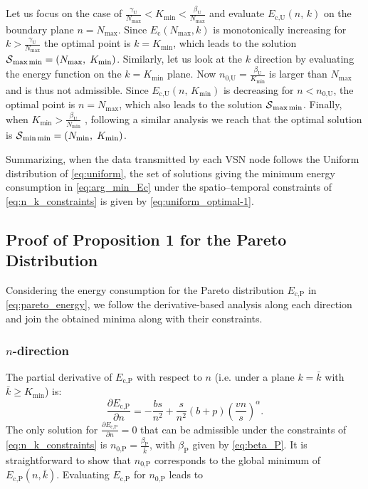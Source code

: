 \documentclass[twocolumn,english]{IEEEtran}
\theoremstyle{plain}
\theoremstyle{definition}
\begin{document}
Let us focus on the case of $\frac{\gamma_{\textrm{U}}}{N_{\text{max}}}<K_{\text{min}}<\frac{\beta_{\text{U}}}{N_{\max}}$
and evaluate $E_{\text{c,U}}(n,\, k)$ on the boundary plane $n=N_{\text{max}}$.
Since $E_{\text{c}}(N_{\text{max}},k)$ is monotonically increasing
for $k>\frac{\gamma_{\textrm{U}}}{N_{\text{max}}}$ the optimal point
is $k=K_{\text{min}}$, which leads to the solution $\text{\ensuremath{\mathcal{S}}}_{\max\min}=\left(N_{\text{max}},\; K_{\text{min}}\right)$.
Similarly, let us look at the $k$ direction by evaluating the energy
function on the $k=K_{\text{min}}$ plane. Now $n_{\text{0,U}}=\frac{\beta_{\text{U}}}{K_{\text{min}}}$
is larger than $N_{\text{max}}$ and is thus not admissible. Since
$E_{\text{c,U}}(n,\, K_{\text{min}})$ is decreasing for $n<n_{\text{0,U}}$,
the optimal point is $n=N_{\text{max}}$, which also leads to the
solution $\text{\ensuremath{\mathcal{S}}}_{\max\min}$. Finally, when
$K_{\text{min}}>\frac{\beta_{\text{U}}}{N_{\min}}$ , following a
similar analysis we reach that the optimal solution is $\text{\ensuremath{\mathcal{S}}}_{\min\min}=\left(N_{\text{min}},\; K_{\text{min}}\right)$.{} 

Summarizing, when the data transmitted by each VSN node follows the
Uniform distribution of \eqref{eq:uniform}, the set of solutions
giving the minimum energy consumption in \eqref{eq:arg_min_Ec} under
the spatio--temporal constraints of \eqref{eq:n_k_constraints} is
given by \eqref{eq:uniform_optimal-1}.


\subsection{Proof of Proposition 1 for the Pareto Distribution\label{sub:Appendix-Pareto}}

Considering the energy consumption for the Pareto distribution $E_{\text{c,P}}$
in \eqref{eq:pareto_energy}, we follow the derivative-based analysis
along each direction and join the obtained minima along with their
constraints.


\subsubsection{$n$-direction}

The partial derivative of $E_{\text{c,P}}$ with respect to $n$ (i.e.
under a plane $k=\bar{k}$ with $\bar{k}\geq K_{\min}$) is: 
\begin{equation}
\frac{\partial E_{\text{c,P}}}{\partial n}=-\frac{bs}{n^{2}}+\frac{s}{n^{2}}\left(b+p\right)\left(\frac{vn}{s}\right)^{\alpha}.
\end{equation}
The only solution for $\frac{\partial E_{\text{c,P}}}{\partial n}=0$
that can be admissible under the constraints of \eqref{eq:n_k_constraints}
is $n_{\text{0,P}}=\frac{\beta_{\text{P}}}{\bar{k}}$, with $\beta_{\text{P}}$
given by \eqref{eq:beta_P}. It is straightforward to show that $n_{\text{0,P}}$
corresponds to the global minimum of $E_{\text{c,P}}\left(n,\bar{k}\right)$.
Evaluating $E_{\text{c,P}}$ for $n_{\text{0,P}}$ leads to
\end{document}
